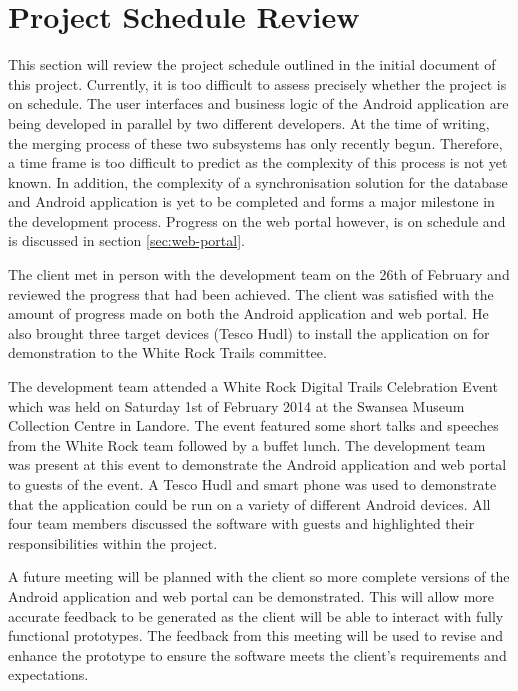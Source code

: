 \documentclass[11pt,a4paper]{article}
\begin{document}
\section{Project Schedule Review}
\label{sec:schedule}
This section will review the project schedule outlined in the initial document of this project. Currently, it is too difficult to assess precisely whether the project is on schedule. The user interfaces and business logic of the Android application are being developed in parallel by two different developers. At the time of writing, the merging process of these two subsystems has only recently begun. Therefore, a time frame is too difficult to predict as the complexity of this process is not yet known. In addition, the complexity of a synchronisation solution for the database and Android application is yet to be completed and forms a major milestone in the development process. Progress on the web portal however, is on schedule and is discussed in section \ref{sec:web-portal}.

The client met in person with the development team on the 26th of February and reviewed the progress that had been achieved. The client was satisfied with the amount of progress made on both the Android application and web portal.  He also brought three target devices (Tesco Hudl) to install the application on for demonstration to the White Rock Trails committee.

The development team attended a White Rock Digital Trails Celebration Event which was held on Saturday 1st of February 2014 at the Swansea Museum Collection Centre in Landore. The event featured some short talks and speeches from the White Rock team followed by a buffet lunch. The development team was present at this event to demonstrate the Android application and web portal to guests of the event. A Tesco Hudl and smart phone was used to demonstrate that the application could be run on a variety of different Android devices. All four team members discussed the software with guests and highlighted their responsibilities within the project.

A future meeting will be planned with the client so more complete versions of the Android application and web portal can be demonstrated. This will allow more accurate feedback to be generated as the client will be able to interact with fully functional prototypes. The feedback from this meeting will be used to revise and enhance the prototype to ensure the software meets the client's requirements and expectations.
\end{document}
